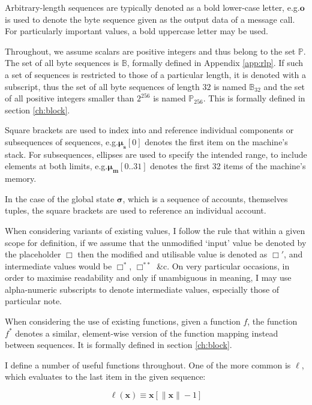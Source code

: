 \documentclass[9pt,oneside]{amsart}
\makeatletter
\newcommand*\eg{e.g.\@\xspace}
\makeatother
\begin{document}
\begin{multicols}{2}
Arbitrary-length sequences are typically denoted as a bold lower-case letter, \eg $\mathbf{o}$ is used to denote the byte sequence given as the output data of a message call. For particularly important values, a bold uppercase letter may be used.

Throughout, we assume scalars are positive integers and thus belong to the set $\mathbb{P}$. The set of all byte sequences is $\mathbb{B}$, formally defined in Appendix \ref{app:rlp}. If such a set of sequences is restricted to those of a particular length, it is denoted with a subscript, thus the set of all byte sequences of length $32$ is named $\mathbb{B}_{32}$ and the set of all positive integers smaller than $2^{256}$ is named $\mathbb{P}_{256}$. This is formally defined in section \ref{ch:block}.

Square brackets are used to index into and reference individual components or subsequences of sequences, \eg $\boldsymbol{\mu}_\mathbf{s}[0]$ denotes the first item on the machine's stack. For subsequences, ellipses are used to specify the intended range, to include elements at both limits, \eg $\boldsymbol{\mu}_\mathbf{m}[0..31]$ denotes the first 32 items of the machine's memory.

In the case of the global state $\boldsymbol{\sigma}$, which is a sequence of accounts, themselves tuples, the square brackets are used to reference an individual account.

When considering variants of existing values, I follow the rule that within a given scope for definition, if we assume that the unmodified `input' value be denoted by the placeholder $\Box$ then the modified and utilisable value is denoted as $\Box'$, and intermediate values would be $\Box^*$,  $\Box^{**}$ \&c. On very particular occasions, in order to maximise readability and only if unambiguous in meaning, I may use alpha-numeric subscripts to denote intermediate values, especially those of particular note.

When considering the use of existing functions, given a function $f$, the function $f^*$ denotes a similar, element-wise version of the function mapping instead between sequences. It is formally defined in section \ref{ch:block}.

I define a number of useful functions throughout. One of the more common is $\ell$, which evaluates to the last item in the given sequence:

\begin{equation}
\ell(\mathbf{x}) \equiv \mathbf{x}[\lVert \mathbf{x} \rVert - 1]
\end{equation}


\end{multicols}
\end{document}
